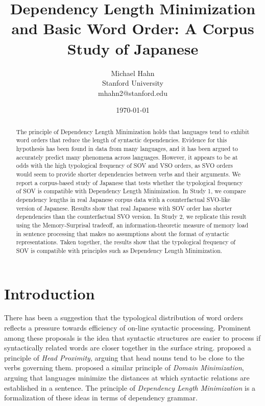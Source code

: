\documentclass[11pt,a4paper]{article}
\title{Dependency Length Minimization and Basic Word Order: A Corpus Study of Japanese}
\author{Michael Hahn \\ Stanford University \\ mhahn2@stanford.edu}
\date{\today}
\begin{document}
\maketitle
\begin{abstract}
The principle of Dependency Length Minimization holds that languages tend to exhibit word orders that reduce the length of syntactic dependencies.
Evidence for this hypothesis has been found in data from many languages, and it has been argued to accurately predict many phenomena across languages.
However, it appears to be at odds with the high typological frequency of SOV and VSO orders, as SVO orders would seem to provide shorter dependencies between verbs and their arguments.
We report a corpus-based study of Japanese that tests whether the typological frequency of SOV is compatible with Dependency Length Minimization.
In Study 1, we compare dependency lengths in real Japanese corpus data with a counterfactual SVO-like version of Japanese.
Results show that real Japanese with SOV order has shorter dependencies than the counterfactual SVO version.
In Study 2, we replicate this result using the Memory-Surprisal tradeoff, an information-theoretic measure of memory load in sentence processing that makes no assumptions about the format of syntactic representations. 
Taken together, the results show that the typological frequency of SOV is compatible with principles such as Dependency Length Minimization.
\end{abstract}


\section{Introduction}

There has been a suggestion that the typological distribution of word orders reflects a pressure towards efficiency of on-line syntactic processing.
Prominent among these proposals is the idea that syntactic structures are easier to process if syntactically related words are closer together in the surface string.
\cite{rijkhoff-word-1986} proposed a principle of \emph{Head Proximity}, arguing that head nouns tend to be close to the verbs governing them.
\cite{hawkins2014crosslinguistic} proposed a similar principle of \emph{Domain Minimization}, arguing that languages minimize the distances at which syntactic relations are established in a sentence.
The principle of \emph{Dependency Length Minimization} \citep{temperley2018minimizing} is a formalization of these ideas in terms of dependency grammar.
\end{document}
